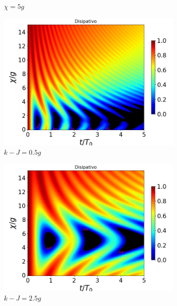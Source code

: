 \begin{figure}[h]
\begin{subfigure}{0.49\textwidth}
        \caption{$\chi=5g$}
        \label{fig4:concu x d2}
    \end{subfigure}
    \vfill
    \begin{subfigure}{0.49\textwidth}
        \includegraphics[width=\textwidth]{figuras/ch4/concu/chi/eg0+ge0 d=0.0g k=0.5g J=0.0g gamma=0.25g concu chi dis.png}
        \caption{$k-J=0.5g$}
        \label{fig4:concu x k1}
    \end{subfigure}
    \hfill
    \begin{subfigure}{0.49\textwidth}
        \includegraphics[width=\textwidth]{figuras/ch4/concu/chi/eg0+ge0 d=0.0g k=2.5g J=0.0g gamma=0.25g concu chi dis.png}
        \caption{$k-J=2.5g$}
        \label{fig4:concu x k2}
    \end{subfigure}
    \caption{}
    \label{fig4:concu x params}
\end{figure}
